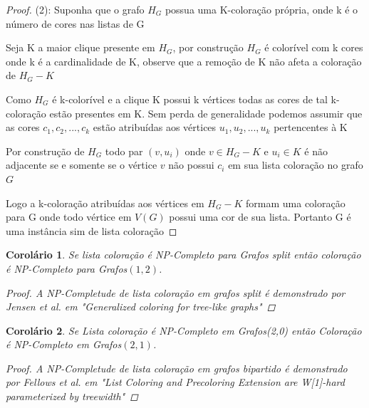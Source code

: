 \documentclass[a4paper,11pt]{article}
\newtheorem{corolario}{Corolário}
\begin{document}
\begin{proof}
      (2):\newline
      Suponha que o grafo $H_G$ possua uma K-coloração própria, onde k é o número de cores nas listas de G
      
      Seja K a maior clique presente em $H_G$, por construção $H_G$ é colorível com k cores onde k é a cardinalidade de K, observe que a remoção de K não afeta a coloração de $H_G - K$
      
      Como $H_G$ é k-colorível e a clique K possui k vértices todas as cores de tal k-coloração estão presentes em K. Sem perda de generalidade podemos assumir que as cores $c_1,c_2,...,c_k$ estão atribuídas aos vértices $u_1,u_2,...,u_k$ pertencentes à K
      
      Por construção de $H_G$ todo par $(v,u_i)$ onde $v \in H_G - K$ e $u_i \in K$ é não adjacente se e somente se o vértice $v$ não possui $c_i$ em sua lista coloração no grafo $G$
      
      Logo a k-coloração atribuídas aos vértices em $H_G - K$ formam uma coloração para G onde todo vértice em $V(G)$ possui uma cor de sua lista. Portanto G é uma instância sim de lista coloração
    \end{proof}
    \begin{corolario}
     Se lista coloração é NP-Completo para Grafos split então coloração é NP-Completo para Grafos$(1,2)$.
     \begin{proof}
     A NP-Completude de lista coloração em grafos split é demonstrado por Jensen et al. em "Generalized coloring for tree-like graphs"
     \end{proof}
    \end{corolario}
    \begin{corolario}
    Se Lista coloração é NP-Completo em Grafos(2,0) então Coloração é NP-Completo em Grafos$(2,1)$.
    \begin{proof}
    A NP-Completude de lista coloração em grafos bipartido é demonstrado por Fellows et al. em "List Coloring and Precoloring Extension are W[1]-hard parameterized by treewidth"
    \end{proof}
    \end{corolario}    
\end{document}
